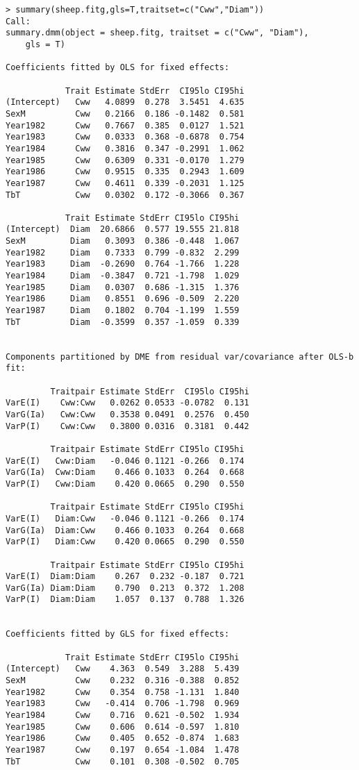 \documentclass[titlepage]{article}  %
\begin{document}
\begin{verbatim}
> summary(sheep.fitg,gls=T,traitset=c("Cww","Diam"))
Call:
summary.dmm(object = sheep.fitg, traitset = c("Cww", "Diam"), 
    gls = T)

Coefficients fitted by OLS for fixed effects:

            Trait Estimate StdErr  CI95lo CI95hi
(Intercept)   Cww   4.0899  0.278  3.5451  4.635
SexM          Cww   0.2166  0.186 -0.1482  0.581
Year1982      Cww   0.7667  0.385  0.0127  1.521
Year1983      Cww   0.0333  0.368 -0.6878  0.754
Year1984      Cww   0.3816  0.347 -0.2991  1.062
Year1985      Cww   0.6309  0.331 -0.0170  1.279
Year1986      Cww   0.9515  0.335  0.2943  1.609
Year1987      Cww   0.4611  0.339 -0.2031  1.125
TbT           Cww   0.0302  0.172 -0.3066  0.367

            Trait Estimate StdErr CI95lo CI95hi
(Intercept)  Diam  20.6866  0.577 19.555 21.818
SexM         Diam   0.3093  0.386 -0.448  1.067
Year1982     Diam   0.7333  0.799 -0.832  2.299
Year1983     Diam  -0.2690  0.764 -1.766  1.228
Year1984     Diam  -0.3847  0.721 -1.798  1.029
Year1985     Diam   0.0307  0.686 -1.315  1.376
Year1986     Diam   0.8551  0.696 -0.509  2.220
Year1987     Diam   0.1802  0.704 -1.199  1.559
TbT          Diam  -0.3599  0.357 -1.059  0.339


Components partitioned by DME from residual var/covariance after OLS-b fit:

         Traitpair Estimate StdErr  CI95lo CI95hi
VarE(I)    Cww:Cww   0.0262 0.0533 -0.0782  0.131
VarG(Ia)   Cww:Cww   0.3538 0.0491  0.2576  0.450
VarP(I)    Cww:Cww   0.3800 0.0316  0.3181  0.442

         Traitpair Estimate StdErr CI95lo CI95hi
VarE(I)   Cww:Diam   -0.046 0.1121 -0.266  0.174
VarG(Ia)  Cww:Diam    0.466 0.1033  0.264  0.668
VarP(I)   Cww:Diam    0.420 0.0665  0.290  0.550

         Traitpair Estimate StdErr CI95lo CI95hi
VarE(I)   Diam:Cww   -0.046 0.1121 -0.266  0.174
VarG(Ia)  Diam:Cww    0.466 0.1033  0.264  0.668
VarP(I)   Diam:Cww    0.420 0.0665  0.290  0.550

         Traitpair Estimate StdErr CI95lo CI95hi
VarE(I)  Diam:Diam    0.267  0.232 -0.187  0.721
VarG(Ia) Diam:Diam    0.790  0.213  0.372  1.208
VarP(I)  Diam:Diam    1.057  0.137  0.788  1.326


Coefficients fitted by GLS for fixed effects:

            Trait Estimate StdErr CI95lo CI95hi
(Intercept)   Cww    4.363  0.549  3.288  5.439
SexM          Cww    0.232  0.316 -0.388  0.852
Year1982      Cww    0.354  0.758 -1.131  1.840
Year1983      Cww   -0.414  0.706 -1.798  0.969
Year1984      Cww    0.716  0.621 -0.502  1.934
Year1985      Cww    0.606  0.614 -0.597  1.810
Year1986      Cww    0.405  0.652 -0.874  1.683
Year1987      Cww    0.197  0.654 -1.084  1.478
TbT           Cww    0.101  0.308 -0.502  0.705


\end{verbatim}
\end{document}
